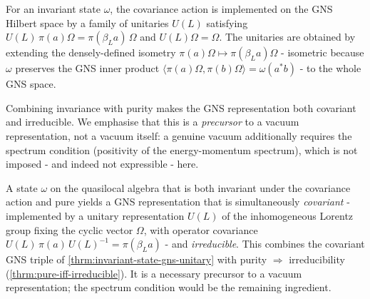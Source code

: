 \begin{theorem}
    \label{thrm:invariant-state-gns-unitary}
    \leanok
    For an invariant state $\omega$, the covariance action is implemented on the GNS Hilbert space by a family of unitaries $U(L)$ satisfying $U(L)\,\pi(a)\Omega = \pi(\beta_L a)\,\Omega$ and $U(L)\Omega = \Omega$. The unitaries are obtained by extending the densely-defined isometry $\pi(a)\Omega \mapsto \pi(\beta_L a)\Omega$ - isometric because $\omega$ preserves the GNS inner product $\langle \pi(a)\Omega, \pi(b)\Omega\rangle = \omega(a^* b)$ - to the whole GNS space.
\end{theorem}

Combining invariance with purity makes the GNS representation both covariant and irreducible. We emphasise that this is a \emph{precursor} to a vacuum representation, not a vacuum itself: a genuine vacuum additionally requires the spectrum condition (positivity of the energy-momentum spectrum), which is not imposed - and indeed not expressible - here.

\begin{theorem}
    \label{thrm:irreducible-covariant-representation}
    \leanok
    A state $\omega$ on the quasilocal algebra that is both invariant under the covariance action and pure yields a GNS representation that is simultaneously \emph{covariant} - implemented by a unitary representation $U(L)$ of the inhomogeneous Lorentz group fixing the cyclic vector $\Omega$, with operator covariance $U(L)\,\pi(a)\,U(L)^{-1} = \pi(\beta_L a)$ - and \emph{irreducible}. This combines the covariant GNS triple of \ref{thrm:invariant-state-gns-unitary} with purity $\Rightarrow$ irreducibility (\ref{thrm:pure-iff-irreducible}). It is a necessary precursor to a vacuum representation; the spectrum condition would be the remaining ingredient.
\end{theorem}

